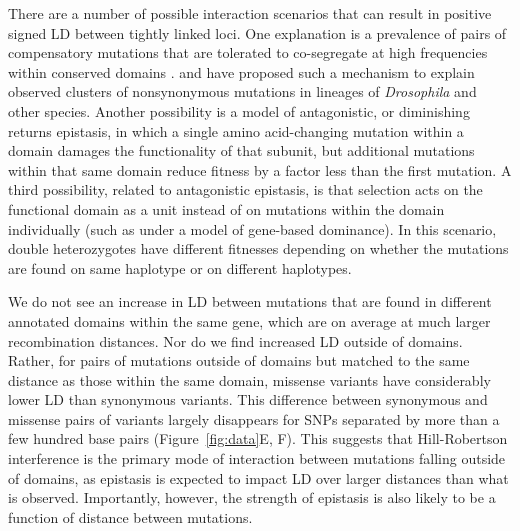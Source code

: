 \documentclass[]{article}
\begin{document}
There are a number of possible interaction scenarios that can result in
positive signed LD between tightly linked loci. One explanation is a prevalence
of pairs of compensatory mutations that are tolerated to co-segregate at high
frequencies within conserved domains \citep{Yeang2007-gj,Ivankov2014-tn}.
\citet{Callahan2011-ac} and \citet{Taverner2020-lk} have proposed such a
mechanism to explain observed clusters of nonsynonymous mutations in lineages
of \emph{Drosophila} and other species. Another possibility is a model of
antagonistic, or diminishing returns epistasis, in which a single amino
acid-changing mutation within a domain damages the functionality of that
subunit, but additional mutations within that same domain reduce fitness by a
factor less than the first mutation. A third possibility, related to
antagonistic epistasis, is that selection acts on the functional domain as a
unit instead of on mutations within the domain individually (such as under a
model of gene-based dominance). In this scenario, double heterozygotes have
different fitnesses depending on whether the mutations are found on same
haplotype or on different haplotypes.

We do not see an increase in LD between mutations that are found in different
annotated domains within the same gene, which are on average at much larger
recombination distances. Nor do we find increased LD outside of domains.
Rather, for pairs of mutations outside of domains but matched to the same
distance as those within the same domain, missense variants have considerably
lower LD than synonymous variants. This difference between synonymous and
missense pairs of variants largely disappears for SNPs separated by more than a
few hundred base pairs (Figure~\ref{fig:data}E, F). This suggests that
Hill-Robertson interference is the primary mode of interaction between
mutations falling outside of domains, as epistasis is expected to impact LD
over larger distances than what is observed. Importantly, however, the strength
of epistasis is also likely to be a function of distance between mutations.
\end{document}
